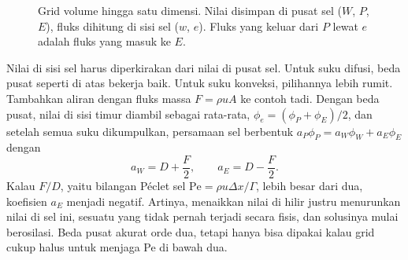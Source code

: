 \begin{figure}[ht]
\centering
{}
\caption{Grid volume hingga satu dimensi. Nilai disimpan di pusat sel ($W$, $P$, $E$), fluks dihitung di sisi
sel ($w$, $e$). Fluks yang keluar dari $P$ lewat $e$ adalah fluks yang masuk ke $E$.}
\label{fig:stensil}
\end{figure}

Nilai di sisi sel harus diperkirakan dari nilai di pusat sel. Untuk suku difusi, beda pusat seperti di atas
bekerja baik. Untuk suku konveksi, pilihannya lebih rumit. Tambahkan aliran dengan fluks massa $F=\rho uA$ ke
contoh tadi. Dengan beda pusat, nilai di sisi timur diambil sebagai rata-rata, $\phi_e=(\phi_P+\phi_E)/2$, dan
setelah semua suku dikumpulkan, persamaan sel berbentuk $a_P\phi_P=a_W\phi_W+a_E\phi_E$ dengan
\begin{equation}
a_W=D+\frac F2,\qquad a_E=D-\frac F2 .
\end{equation}
Kalau $F/D$, yaitu bilangan Péclet sel $\mathrm{Pe}=\rho u\Delta x/\Gamma$, lebih besar dari dua, koefisien $a_E$
menjadi negatif. Artinya, menaikkan nilai di hilir justru menurunkan nilai di sel ini, sesuatu yang tidak pernah
terjadi secara fisis, dan solusinya mulai berosilasi. Beda pusat akurat orde dua, tetapi hanya bisa dipakai kalau
grid cukup halus untuk menjaga Pe di bawah dua.


